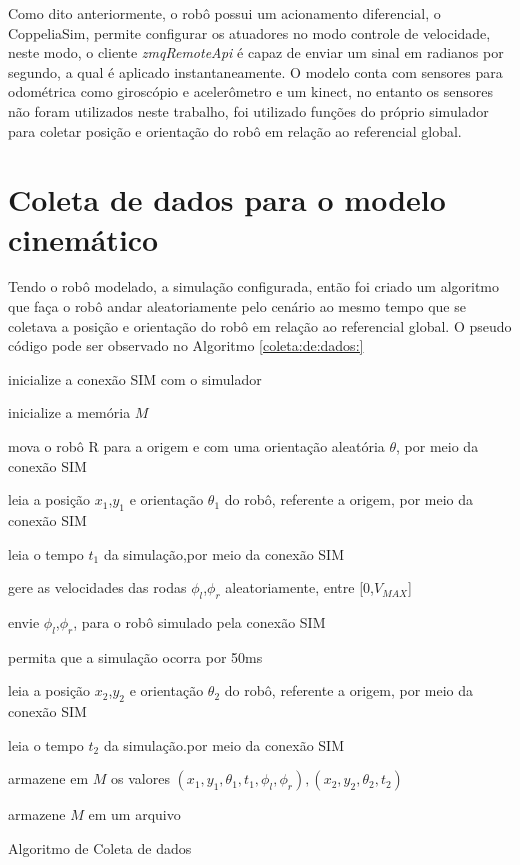 Como dito anteriormente, o robô possui um acionamento diferencial,
o CoppeliaSim, permite configurar os atuadores no modo controle de
velocidade, neste modo, o cliente \textit{zmqRemoteApi} é capaz de enviar
um sinal em radianos por segundo, a qual é aplicado instantaneamente.
O modelo conta com sensores para odométrica como giroscópio e acelerômetro
e um kinect, no entanto os sensores não foram utilizados neste trabalho,
foi utilizado funções do próprio simulador para coletar posição e 
orientação do robô em relação ao referencial global.

\section{Coleta de dados para o modelo cinemático}
Tendo o robô modelado, a simulação configurada, então foi criado
um algoritmo que faça o robô andar aleatoriamente pelo cenário ao mesmo
tempo que se coletava a posição e orientação do robô em relação ao referencial
global. O pseudo código pode ser observado no Algoritmo \ref{coleta:de:dados:}

\begin{algorithm}[H]
    \label{coleta:de:dados:}
    
    
    inicialize a conexão SIM  com o simulador

    inicialize a memória $M$

    mova o robô R para a origem e com uma orientação aleatória $\theta$,
    por meio da conexão SIM

     {
        leia a posição $x_1$,$y_1$  e orientação $\theta_{1}$ do robô,
        referente a origem, por meio da conexão SIM
        
        leia o tempo $t_1$ da simulação,por meio da conexão SIM
        
        gere as velocidades das rodas $\phi_l$,$\phi_r$ aleatoriamente,
        entre [0,$V_{MAX}$]
        
        envie  $\phi_l$,$\phi_r$, para o robô simulado pela conexão SIM

        permita que a simulação ocorra por 50ms 

        leia a posição $x_2$,$y_2$  e orientação $\theta_{2}$ do robô,
        referente a origem, por meio da conexão SIM

        leia o tempo $t_2$ da simulação.por meio da conexão SIM

        
        armazene em $M$ os valores  $(x_1,y_1,\theta_{1},t_1,\phi_l,\phi_r),(x_2,y_2,\theta_{2},t_2)$
        
    }

    armazene $M$ em um arquivo
    
    \caption{Algoritmo de Coleta de dados}
    
\end{algorithm}

